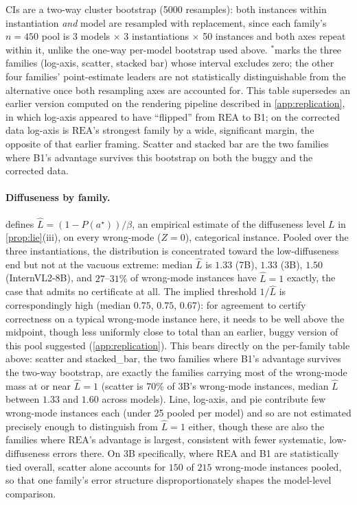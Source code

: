 \documentclass[11pt]{article}
\newcommand{\rea}{\mathrm{REA}}
\begin{document}
\noindent CIs are a two-way cluster bootstrap (5000 resamples): both instances within instantiation \emph{and} model are resampled with replacement, since each family's $n{=}450$ pool is 3 models $\times$ 3 instantiations $\times$ 50 instances and both axes repeat within it, unlike the one-way per-model bootstrap used above. $^\ast$marks the three families (log-axis, scatter, stacked bar) whose interval excludes zero; the other four families' point-estimate leaders are not statistically distinguishable from the alternative once both resampling axes are accounted for. This table supersedes an earlier version computed on the rendering pipeline described in \cref{app:replication}, in which log-axis appeared to have ``flipped'' from $\rea$ to B1; on the corrected data log-axis is $\rea$'s strongest family by a wide, significant margin, the opposite of that earlier framing. Scatter and stacked bar are the two families where B1's advantage survives this bootstrap on both the buggy and the corrected data.

\paragraph{Diffuseness by family.}  defines $\hat L = (1-P(a^\star))/\beta$, an empirical estimate of the diffuseness level $L$ in \cref{prop:lie}(iii), on every wrong-mode ($Z{=}0$), categorical instance. Pooled over the three instantiations, the distribution is concentrated toward the low-diffuseness end but not at the vacuous extreme: median $\hat L$ is $1.33$ (7B), $1.33$ (3B), $1.50$ (InternVL2-8B), and $27$--$31\%$ of wrong-mode instances have $\hat L{=}1$ exactly, the case that admits no certificate at all. The implied threshold $1/\hat L$ is correspondingly high (median $0.75$, $0.75$, $0.67$): for agreement to certify correctness on a typical wrong-mode instance here, it needs to be well above the midpoint, though less uniformly close to total than an earlier, buggy version of this pool suggested (\cref{app:replication}). This bears directly on the per-family table above: scatter and stacked\_bar, the two families where B1's advantage survives the two-way bootstrap, are exactly the families carrying most of the wrong-mode mass at or near $\hat L{=}1$ (scatter is $70\%$ of 3B's wrong-mode instances, median $\hat L$ between $1.33$ and $1.60$ across models). Line, log-axis, and pie contribute few wrong-mode instances each (under 25 pooled per model) and so are not estimated precisely enough to distinguish from $\hat L{=}1$ either, though these are also the families where $\rea$'s advantage is largest, consistent with fewer systematic, low-diffuseness errors there. On 3B specifically, where $\rea$ and B1 are statistically tied overall, scatter alone accounts for $150$ of $215$ wrong-mode instances pooled, so that one family's error structure disproportionately shapes the model-level comparison.
\end{document}
